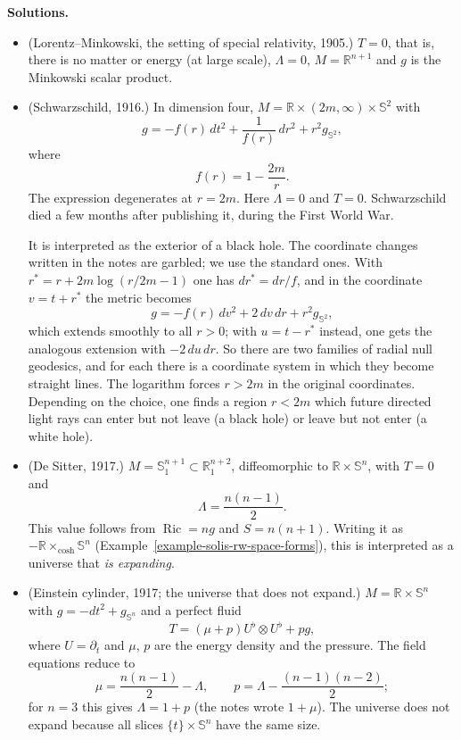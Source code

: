 \medskip\noindent
{\bf Solutions.}
\begin{itemize}
\item (Lorentz--Minkowski, the setting of
special relativity, 1905.) $T=0$, that
is, there is no matter or energy (at
large scale), $\Lambda=0$,
$M=\mathbb{R}^{n+1}$ and $g$ is the
Minkowski scalar product.

\item (Schwarzschild, 1916.) In dimension
four, $M=\mathbb{R}\times(2m,\infty)\times
\mathbb{S}^2$ with
$$
g=-f(r)\,dt^2+\frac{1}{f(r)}\,dr^2
+r^2g_{\mathbb{S}^2},
$$
where
$$
f(r)=1-\frac{2m}{r}.
$$
The expression degenerates at $r=2m$.
Here $\Lambda=0$ and $T=0$. Schwarzschild
died a few months after publishing it,
during the First World War.

It is interpreted as the exterior of a
black hole. The coordinate changes written
in the notes are garbled; we use the
standard ones. With
$r^*=r+2m\log(r/2m-1)$ one has
$dr^*=dr/f$, and in the coordinate
$v=t+r^*$ the metric becomes
$$
g=-f(r)\,dv^2+2\,dv\,dr
+r^2g_{\mathbb{S}^2},
$$
which extends smoothly to all $r>0$; with
$u=t-r^*$ instead, one gets the analogous
extension with $-2\,du\,dr$. So there are
two families of radial null geodesics,
and for each there is a coordinate system
in which they become straight lines. The
logarithm forces $r>2m$ in the original
coordinates. Depending on the choice, one
finds a region $r<2m$ which future
directed light rays can enter but not
leave (a black hole) or leave but not
enter (a white hole).

\item (De Sitter, 1917.)
$M=\mathbb{S}^{n+1}_1\subset
\mathbb{R}^{n+2}_1$, diffeomorphic to
$\mathbb{R}\times\mathbb{S}^n$, with
$T=0$ and
$$
\Lambda=\frac{n(n-1)}{2}.
$$
This value follows from
$\operatorname{Ric}=ng$ and $S=n(n+1)$.
Writing it as
$-\mathbb{R}\times_{\cosh}\mathbb{S}^n$
(Example~\ref{example-solis-rw-space-forms}),
this is interpreted as a universe that
\emph{is expanding}.

\item (Einstein cylinder, 1917; the
universe that does not expand.)
$M=\mathbb{R}\times\mathbb{S}^n$ with
$g=-dt^2+g_{\mathbb{S}^n}$ and a perfect
fluid
$$
T=(\mu+p)U^{\flat}\otimes U^{\flat}+pg,
$$
where $U=\partial_t$ and $\mu$, $p$ are
the energy density and the pressure. The
field equations reduce to
$$
\mu=\frac{n(n-1)}{2}-\Lambda,\qquad
p=\Lambda-\frac{(n-1)(n-2)}{2};
$$
for $n=3$ this gives $\Lambda=1+p$ (the
notes wrote $1+\mu$). The universe does not
expand because all slices $\{t\}\times
\mathbb{S}^n$ have the same size.


\end{itemize}
